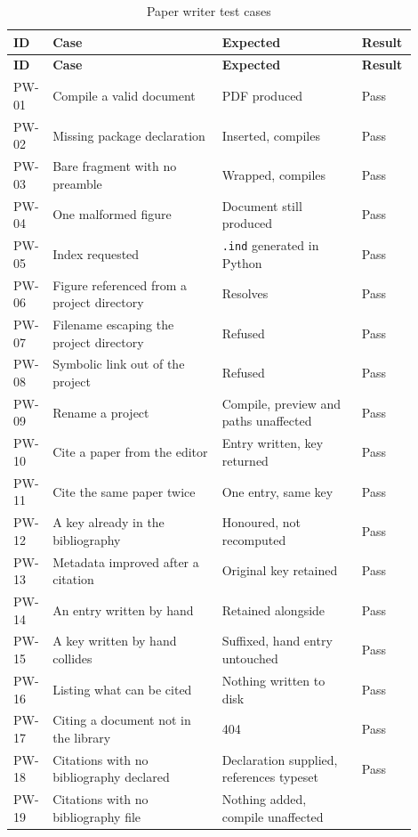 \documentclass[12pt,a4paper]{report}
\begin{document}
\begin{longtable}{@{}p{0.07\linewidth}p{0.40\linewidth}p{0.33\linewidth}p{0.10\linewidth}@{}}
\caption{Paper writer test cases}\label{tab:pw}\\
\toprule
\textbf{ID} & \textbf{Case} & \textbf{Expected} & \textbf{Result} \\
\midrule
\endfirsthead
\toprule
\textbf{ID} & \textbf{Case} & \textbf{Expected} & \textbf{Result} \\
\midrule
\endhead

PW-01 & Compile a valid document & PDF produced & Pass \\
PW-02 & Missing package declaration & Inserted, compiles & Pass \\
PW-03 & Bare fragment with no preamble & Wrapped, compiles & Pass \\
PW-04 & One malformed figure & Document still produced & Pass \\
PW-05 & Index requested & \texttt{.ind} generated in Python & Pass \\
PW-06 & Figure referenced from a project directory & Resolves & Pass \\
PW-07 & Filename escaping the project directory & Refused & Pass \\
PW-08 & Symbolic link out of the project & Refused & Pass \\
PW-09 & Rename a project & Compile, preview and paths unaffected & Pass \\
PW-10 & Cite a paper from the editor & Entry written, key returned & Pass \\
PW-11 & Cite the same paper twice & One entry, same key & Pass \\
PW-12 & A key already in the bibliography & Honoured, not recomputed & Pass \\
PW-13 & Metadata improved after a citation & Original key retained & Pass \\
PW-14 & An entry written by hand & Retained alongside & Pass \\
PW-15 & A key written by hand collides & Suffixed, hand entry untouched
  & Pass \\
PW-16 & Listing what can be cited & Nothing written to disk & Pass \\
PW-17 & Citing a document not in the library & 404 & Pass \\
PW-18 & Citations with no bibliography declared & Declaration supplied,
  references typeset & Pass \\
PW-19 & Citations with no bibliography file & Nothing added, compile unaffected

\end{longtable}
\end{document}
